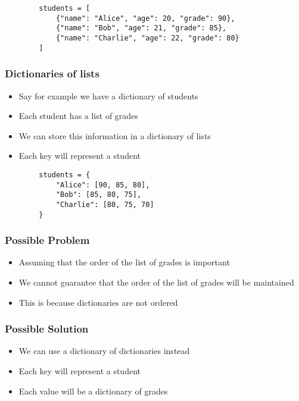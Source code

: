 \documentclass[serif, 9pt, aspectratio=32]{beamer}
\begin{document}
\begin{frame}[fragile]
    \begin{lstlisting}
        students = [
            {"name": "Alice", "age": 20, "grade": 90},
            {"name": "Bob", "age": 21, "grade": 85},
            {"name": "Charlie", "age": 22, "grade": 80}
        ]
    \end{lstlisting}
\end{frame}

\begin{frame}
    \centering
    \frametitle{Dictionaries of lists}
    \begin{itemize}
        \setlength{\itemsep}{3em}
        \item Say for example we have a dictionary of students
        \item Each student has a list of grades
        \item We can store this information in a dictionary of lists
        \item Each key will represent a student
    \end{itemize}
\end{frame}

\begin{frame}[fragile]
    \begin{lstlisting}
        students = {
            "Alice": [90, 85, 80],
            "Bob": [85, 80, 75],
            "Charlie": [80, 75, 70]
        }
    \end{lstlisting}
\end{frame}

\begin{frame}
    \centering
    \frametitle{Possible Problem}
    \begin{itemize}
        \setlength{\itemsep}{3em}
        \item Assuming that the order of the list of grades is important
        \item We cannot guarantee that the order of the list of grades will be maintained
        \item This is because dictionaries are not ordered
    \end{itemize}
\end{frame}

\begin{frame}
    \centering
    \frametitle{Possible Solution}
    \begin{itemize}
        \setlength{\itemsep}{3em}
        \item We can use a dictionary of dictionaries instead
        \item Each key will represent a student
        \item Each value will be a dictionary of grades
    \end{itemize}
\end{frame}
\end{document}
